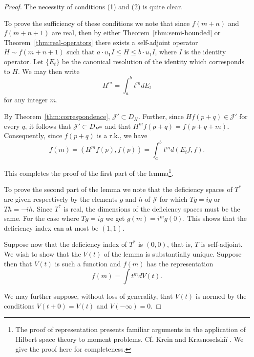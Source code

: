 \documentclass{article}
\begin{document}
\begin{proof}
The necessity of conditions (1) and (2) is quite clear.

To prove the sufficiency of these conditions we note that since $f(m+n)$ and $f(m+n+1)$ are real, then by either Theorem~\ref{thm:semi-bounded} or Theorem~\ref{thm:real-operators} there exists a self-adjoint operator $H \sim f(m+n+1)$ such that $a \cdot u_1 I \leq H \leq b \cdot u_1 I$, where $I$ is the identity operator. Let $\{E_t\}$ be the canonical resolution of the identity which corresponds to $H$. We may then write
\begin{equation}
H^m = \int_a^b t^m dE_t
\label{eq:spectral-representation}
\end{equation}
for any integer $m$.

By Theorem~\ref{thm:correspondence}, $\mathcal{J}' \subset D_H$. Further, since $H f(p+q) \in \mathcal{J}'$ for every $q$, it follows that $\mathcal{J}' \subset D_{H^m}$ and that $H^m f(p+q) = f(p+q+m)$. Consequently, since $f(p+q)$ is a r.k., we have
\begin{equation}
f(m) = (H^m f(p), f(p)) = \int_a^b t^m d(E_t f, f).
\label{eq:moment-formula}
\end{equation}

This completes the proof of the first part of the lemma\footnote{The proof of representation presents familiar arguments in the application of Hilbert space theory to moment problems. Cf. Krein and Krasnoselskiï \cite{krein-krasnoselskii}. We give the proof here for completeness.}.

To prove the second part of the lemma we note that the deficiency spaces of $T^*$ are given respectively by the elements $g$ and $h$ of $\mathcal{J}$ for which $Tg = ig$ or $Th = -ih$. Since $T^*$ is real, the dimensions of the deficiency spaces must be the same. For the case where $Tg = ig$ we get $g(m) = i^m g(0)$. This shows that the deficiency index can at most be $(1,1)$.

Suppose now that the deficiency index of $T^*$ is $(0, 0)$, that is, $T$ is self-adjoint. We wish to show that the $V(t)$ of the lemma is substantially unique. Suppose then that $V(t)$ is such a function and $f(m)$ has the representation
\begin{equation}
f(m) = \int t^m dV(t).
\label{eq:alternative-representation}
\end{equation}

We may further suppose, without loss of generality, that $V(t)$ is normed by the conditions $V(t+0) = V(t)$ and $V(-\infty) = 0$.


\end{proof}
\end{document}
